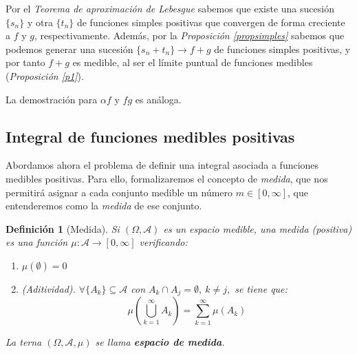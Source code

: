 \documentclass[11pt, a4paper]{article}
\makeatletter
\newif\IfInSansMode
\let\oldsf\sffamily
\renewcommand*{\sffamily}{\oldsf\mathversion{sans}\InSansModetrue}
\let\oldnorm\normalfont
\renewcommand*{\normalfont}{\oldnorm\InSansModefalse\mathversion{normal}}
\renewenvironment{proof}[1][\proofname] {\par\pushQED{\qed}\normalfont\topsep6\p@\@plus6\p@\relax\trivlist\item[\hskip\labelsep\itshape\sffamily#1\@addpunct{.}]\ignorespaces}{\popQED\endtrivlist\@endpefalse}
\theoremstyle{theorem-style}
\theoremstyle{definition-style}
\newtheorem{ndef}{Definición}[section]
\theoremstyle{remark-style}
\theoremstyle{example-style}
\newenvironment{nlist}
{\begin{enumerate}
    \renewcommand\labelenumi{(\emph{\roman{enumi})}}}
  {\end{enumerate}}
\makeatother
\begin{document}
  \begin{proof}
    Por el \textit{Teorema de aproximación de Lebesgue} sabemos que existe una sucesión $\{s_n\}$ y otra $\{t_n\}$ de funciones simples positivas que convergen de forma creciente a $f$ y $g$, respectivamente. Además, por la \textit{Proposición \ref{propsimples}} sabemos que podemos generar una sucesión $\{s_n+t_n\} \to f+g$ de funciones simples positivas, y por tanto $f+g$ es medible, al ser el límite puntual de funciones medibles (\textit{Proposición \ref{p1}}).
    
    La demostración para $ \alpha f$ y $fg$ es análoga.
  \end{proof}



\subsection{Integral de funciones medibles positivas}

Abordamos ahora el problema de definir una integral asociada a funciones medibles positivas. Para ello, formalizaremos el concepto de \textit{medida}, que nos permitirá asignar a cada conjunto medible un número $m \in [0,\infty]$, que entenderemos como la \textit{medida} de ese conjunto. 

\begin{ndef}[Medida]
  Si $(\Omega, \mathscr A)$ es un espacio medible, una medida (positiva) es una función $\mu: \mathscr A \rightarrow [0, \infty]$ verificando:
  \begin{nlist}
  \item $\mu(\emptyset) = 0$
  \item \textit{(Aditividad).} $\forall \{A_k\} \subseteq \mathscr A$ con $A_k\cap A_j = \emptyset,\ k \neq j,$ se tiene que:
    $$\mu \left( \bigcup_{k=1}^\infty A_k \right) = \sum_{k=1}^\infty \mu(A_k) $$
  \end{nlist}
  La terna $(\Omega, \mathscr A, \mu)$ se llama \textbf{espacio de medida}.
\end{ndef}
\end{document}
